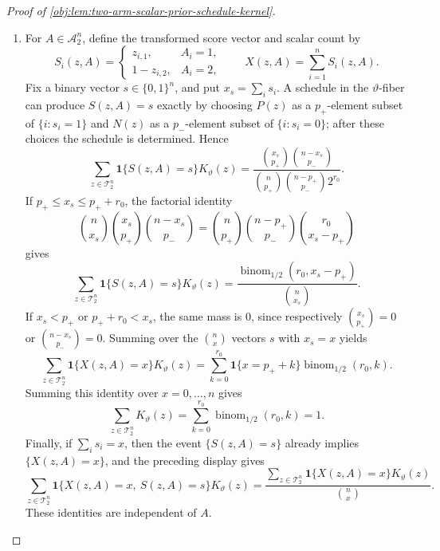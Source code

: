 \begin{proof}[Proof of \cref{obj:lem:two-arm-scalar-prior-schedule-kernel}]
\begin{enumerate}
\item For \(A\in\mathcal A_2^n\), define the transformed score vector and scalar count by
\[
S_i(z,A)=
\begin{cases}
z_{i,1},&A_i=1,\\
1-z_{i,2},&A_i=2,
\end{cases}
\qquad
X(z,A)=\sum_{i=1}^n S_i(z,A).
\]
Fix a binary vector \(s\in\{0,1\}^n\), and put \(x_s=\sum_i s_i\).  A schedule in the \(\vartheta\)-fiber can produce \(S(z,A)=s\) exactly by choosing \(P(z)\) as a \(p_+\)-element subset of \(\{i:s_i=1\}\) and \(N(z)\) as a \(p_-\)-element subset of \(\{i:s_i=0\}\); after these choices the schedule is determined.  Hence
\[
\sum_{z\in\mathcal T_2^n}
\mathbf 1\{S(z,A)=s\}K_\vartheta(z)
=
\frac{\binom{x_s}{p_+}\binom{n-x_s}{p_-}}
{\binom n{p_+}\binom{n-p_+}{p_-}2^{r_0}}.
\]
If \(p_+\le x_s\le p_++r_0\), the factorial identity
\[
\binom n{x_s}\binom{x_s}{p_+}\binom{n-x_s}{p_-}
=
\binom n{p_+}\binom{n-p_+}{p_-}\binom{r_0}{x_s-p_+}
\]
gives
\[
\sum_{z\in\mathcal T_2^n}
\mathbf 1\{S(z,A)=s\}K_\vartheta(z)
=
\frac{\operatorname{binom}_{1/2}(r_0,x_s-p_+)}{\binom n{x_s}}.
\]
If \(x_s<p_+\) or \(p_++r_0<x_s\), the same mass is \(0\), since respectively \(\binom{x_s}{p_+}=0\) or \(\binom{n-x_s}{p_-}=0\).  Summing over the \(\binom n x\) vectors \(s\) with \(x_s=x\) yields
\[
\sum_{z\in\mathcal T_2^n}
\mathbf 1\{X(z,A)=x\}K_\vartheta(z)
=
\sum_{k=0}^{r_0}
\mathbf 1\{x=p_+ + k\}\operatorname{binom}_{1/2}(r_0,k).
\]
Summing this identity over \(x=0,\ldots,n\) gives
\[
\sum_{z\in\mathcal T_2^n}K_\vartheta(z)
=
\sum_{k=0}^{r_0}\operatorname{binom}_{1/2}(r_0,k)=1.
\]
Finally, if \(\sum_i s_i=x\), then the event \(\{S(z,A)=s\}\) already implies \(\{X(z,A)=x\}\), and the preceding display gives
\[
\sum_{z\in\mathcal T_2^n}
\mathbf 1\{X(z,A)=x,\ S(z,A)=s\}K_\vartheta(z)
=
\frac{
\sum_{z\in\mathcal T_2^n}\mathbf 1\{X(z,A)=x\}K_\vartheta(z)
}{
\binom n x
}.
\]
These identities are independent of \(A\). %


\end{enumerate}
\end{proof}
